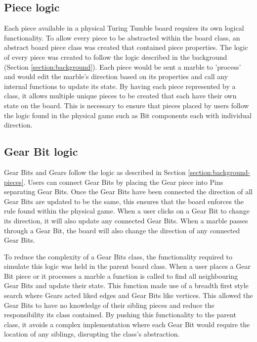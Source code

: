 \documentclass{l4proj}
\begin{document}
\subsection{Piece logic}
Each piece available in a physical Turing Tumble board requires its own logical functionality. To allow every piece to be abstracted within the board class, an abstract board piece class was created that contained piece properties. The logic of every piece was created to follow the logic described in the background (Section \ref{section:background}). Each piece would be sent a marble to 'process' and would edit the marble's direction based on its properties and call any internal functions to update its state. By having each piece represented by a class, it allows multiple unique pieces to be created that each have their own state on the board. This is necessary to ensure that pieces placed by users follow the logic found in the physical game such as Bit components each with individual direction.  


\subsection{Gear Bit logic}
Gear Bits and Gears follow the logic as described in Section \ref{section:background-pieces}. Users can connect Gear Bits by placing the Gear piece into Pins separating Gear Bits. Once the Gear Bits have been connected the direction of all Gear Bits are updated to be the same, this ensures that the board enforces the rule found within the physical game. When a user clicks on a Gear Bit to change its direction, it will also update any connected Gear Bits. When a marble passes through a Gear Bit, the board will also change the direction of any connected Gear Bits.

To reduce the complexity of a Gear Bits class, the functionality required to simulate this logic was held in the parent board class. When a user places a Gear Bit piece or it processes a marble a function is called to find all neighbouring Gear Bits and update their state. This function made use of a breadth first style search where Gears acted liked edges and Gear Bits like vertices. This allowed the Gear Bits to have no knowledge of their sibling pieces and reduce the responsibility its class contained. By pushing this functionality to the parent class, it avoids a complex implementation where each Gear Bit would require the location of any siblings, disrupting the class's abstraction.
\end{document}
